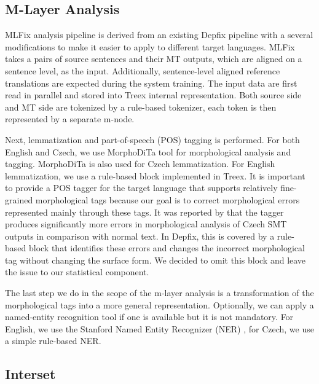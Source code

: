 \subsection{M-Layer Analysis}

MLFix analysis pipeline is derived from an existing Depfix pipeline
with a several modifications to make it easier to apply to different
target languages. MLFix takes a pairs of source sentences and their MT outputs, which
are aligned on a sentence level, as the input. Additionally, sentence-level aligned reference
translations are expected during the system training.
The input data are first read in parallel and stored into Treex internal representation.
Both source side and MT side are tokenized by a rule-based tokenizer, each token is then
represented by a separate m-node.

Next, lemmatization and part-of-speech (POS) tagging is performed.
For both English and Czech, we use MorphoDiTa \citep{strakova14:morphodita}
tool for morphological analysis and tagging. MorphoDiTa is also used for Czech lemmatization.
For English lemmatization, we use a rule-based block implemented in Treex.
It is important to provide a POS tagger for the target language that supports
relatively fine-grained morphological tags because our goal is to correct morphological
errors represented mainly through these tags.
It was reported by \citet[p. 33]{biblio:RoAutomaticpostediting2013} that the tagger produces significantly more
errors in morphological analysis of Czech SMT outputs in comparison with normal text. In Depfix, this is covered
by a rule-based block that identifies these errors and changes the incorrect morphological tag without
changing the surface form. We decided to omit this block and leave the issue to our statistical
component.

The last step we do in the scope of the m-layer analysis is a transformation of the morphological tags into
a more general representation. Optionally, we can apply a named-entity recognition
tool if one is available but it is not mandatory. For English, we use the Stanford
Named Entity Recognizer (NER) \citep{Finkel:2005:INI:1219840.1219885},
for Czech, we use a simple rule-based NER. 

\subsection{Interset}

